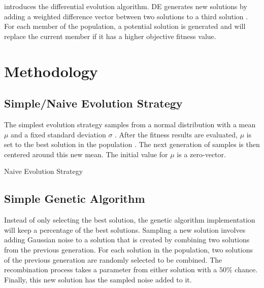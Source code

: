 \documentclass[conference]{IEEEtran}
\begin{document}
\cite{de} introduces the differential evolution algorithm. DE generates new solutions by adding a weighted difference vector between two solutions to 
a third solution \cite{de}. For each member of the population, a potential solution is generated and will replace the current member if it has a 
higher objective fitness value.

\section{Methodology}
\subsection{Simple/Naive Evolution Strategy}
The simplest evolution strategy samples from a normal distribution with a mean $\mu$ and a fixed standard deviation $\sigma$ \cite{otoro}. After the 
fitness results are evaluated, $\mu$ is set to the best solution in the population \cite{otoro}. The next generation of samples is then centered around 
this new mean. The initial value for $\mu$ is a zero-vector.

\begin{algorithm}[htbp]
\SetAlgoLined
{}
\caption{Naive Evolution Strategy}
\label{alg:ses}
\end{algorithm}

\subsection{Simple Genetic Algorithm}
Instead of only selecting the best solution, the genetic algorithm implementation will keep a percentage of the best solutions. Sampling a new solution 
involves adding Gaussian noise to a solution that is created by combining two solutions from the previous generation. For each solution in the 
population, two solutions of the previous generation are randomly selected to be combined. The recombination process takes a parameter from either 
solution with a $50$\% chance. Finally, this new solution has the sampled noise added to it.
\end{document}
